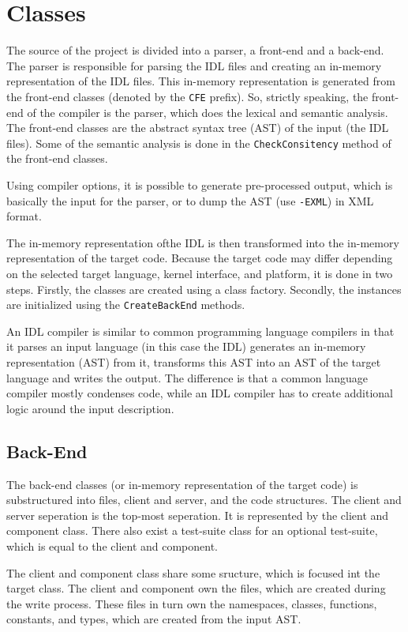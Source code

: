 \section{Classes}
\label{sec:classes}

The source of the \dice{} project is divided into a parser, a
front-end and a back-end.  The parser is responsible for parsing
the IDL files and creating an in-memory representation of the
IDL files.  This in-memory representation is generated from the
front-end classes (denoted by the \verb|CFE| prefix).  So, strictly
speaking, the front-end of the compiler is the parser, which does
the lexical and semantic analysis.  The front-end classes are the
abstract syntax tree (AST) of the input (the IDL files).  Some of
the semantic analysis is done in the \verb|CheckConsitency| method
of the front-end classes.

Using compiler options, it is possible to generate pre-processed
output, which is basically the input for the parser, or to dump
the AST (use \verb|-EXML|) in XML format.

The in-memory representation ofthe IDL is then transformed into 
the in-memory representation of the target code.  Because the target
code may differ depending on the selected target language, kernel
interface, and platform, it is done in two steps.  Firstly, the
classes are created using a class factory.  Secondly, the instances
are initialized using the \verb|CreateBackEnd| methods.

An IDL compiler is similar to common programming language compilers
in that it parses an input language (in this case the IDL) generates
an in-memory representation (AST) from it, transforms this AST into
an AST of the target language and writes the output.  The difference
is that a common language compiler mostly condenses code, while an
IDL compiler has to create additional logic around the input 
description.

\subsection{Back-End}
The back-end classes (or in-memory representation of the target 
code) is substructured into files, client and server, and the
code structures.  The client and server seperation is the top-most
seperation.  It is represented by the client and component class.
There also exist a test-suite class for an optional test-suite, which
is equal to the client and component.

The client and component class share some sructure, which is 
focused int the target class.  The client and component own the
files, which are created during the write process.  These files in
turn own the namespaces, classes, functions, constants, and types,
which are created from the input AST.

